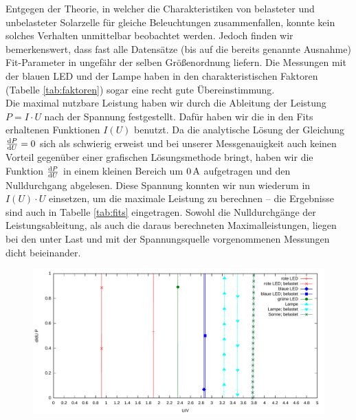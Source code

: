 \documentclass[numbers=noenddot,12pt,a4paper]{scrartcl}
\newcommand{\diff}{\textnormal{d}}
\begin{document}
Entgegen der Theorie, in welcher die Charakteristiken von belasteter und unbelasteter Solarzelle für gleiche Beleuchtungen zusammenfallen, konnte kein solches Verhalten unmittelbar beobachtet werden. Jedoch finden wir bemerkenswert, dass fast alle Datensätze (bis auf die bereits genannte Ausnahme) Fit-Parameter in ungefähr der selben Größenordnung liefern. Die Messungen mit der blauen LED und der Lampe haben in den charakteristischen Faktoren (Tabelle \ref{tab:faktoren}) sogar eine recht gute Übereinstimmung.\\
Die maximal nutzbare Leistung haben wir durch die Ableitung der Leistung $P=I\cdot U$ nach der Spannung festgestellt. Dafür haben wir die in den Fits erhaltenen Funktionen $I(U)$ benutzt. Da die analytische Lösung der Gleichung $\frac{\diff P}{\diff U}=0$ sich als schwierig erweist und bei unserer Messgenauigkeit auch keinen Vorteil gegenüber einer grafischen Lösungsmethode bringt, haben wir die Funktion $\frac{\diff P}{\diff U}$ in einem kleinen Bereich um $\unit[0]{A}$ aufgetragen und den Nulldurchgang abgelesen. Diese Spannung konnten wir nun wiederum in $I(U)\cdot U$ einsetzen, um die maximale Leistung zu berechnen -- die Ergebnisse sind auch in Tabelle \ref{tab:fits} eingetragen. Sowohl die Nulldurchgänge der Leistungsableitung, als auch die daraus berechneten Maximalleistungen, liegen bei den unter Last und mit der Spannungsquelle vorgenommenen Messungen dicht beieinander.
\begin{figure}[H]
	\includegraphics[width=\textwidth]{messwerte/leistungsmaxima.pdf}
\end{figure}
\end{document}
